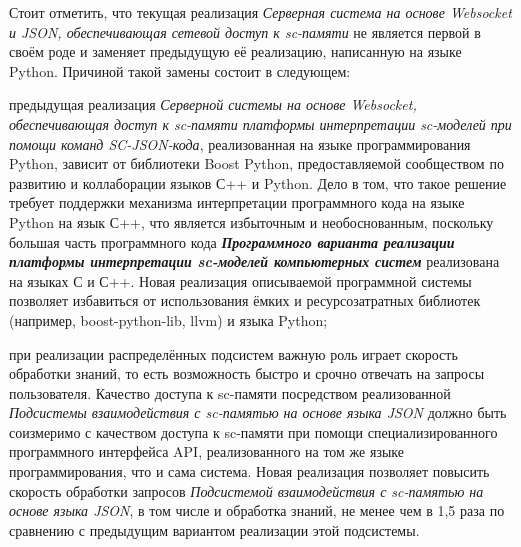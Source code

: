 Стоит отметить, что текущая реализация \textit{Серверная система на основе Websocket и JSON, обеспечивающая сетевой доступ
к sc-памяти} не является первой в своём роде и заменяет предыдущую её реализацию, написанную на языке Python. Причиной
такой замены состоит в следующем:
\begin{scnitemize}
    \item предыдущая реализация \textit{Серверной системы на основе Websocket, обеспечивающая доступ к sc-памяти
    платформы интерпретации sc-моделей при помощи команд SC-JSON-кода}, реализованная на языке программирования Python,
    зависит от библиотеки Boost Python, предоставляемой сообществом по развитию и коллаборации языков С++ и Python.
    Дело в том, что такое решение требует поддержки механизма интерпретации программного кода на языке Python на язык С++,
    что является избыточным и необоснованным, поскольку большая часть программного кода \textit{\textbf{Программного
    варианта реализации платформы интерпретации sc-моделей компьютерных систем}} реализована на языках С и С++. Новая
    реализация описываемой программной системы позволяет избавиться от использования ёмких и ресурсозатратных библиотек
    (например, boost-python-lib, llvm) и языка Python;
    \item при реализации распределённых подсистем важную роль играет скорость обработки знаний, то есть возможность
    быстро и срочно отвечать на запросы пользователя. Качество доступа к sc-памяти посредством реализованной
    \textit{Подсистемы взаимодействия с sc-памятью на основе языка JSON} должно быть соизмеримо с качеством доступа
    к sc-памяти при помощи специализированного программного интерфейса API, реализованного на том же языке
    программирования, что и сама система. Новая реализация позволяет повысить скорость обработки запросов
    \textit{Подсистемой взаимодействия с sc-памятью на основе языка JSON}, в том числе и обработка знаний, не менее
    чем в 1,5 раза по сравнению с предыдущим вариантом реализации этой подсистемы.
\end{scnitemize}

